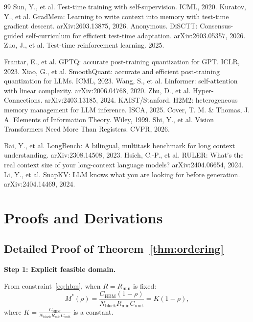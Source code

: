 \documentclass[11pt,a4paper]{article}
\theoremstyle{plain}
\theoremstyle{definition}
\begin{document}
\begin{thebibliography}{99}
 Sun, Y., et al. Test-time training with self-supervision. ICML, 2020.
 Kuratov, Y., et al. GradMem: Learning to write context into memory with test-time gradient descent. arXiv:2603.13875, 2026.
 Anonymous. DiSCTT: Consensus-guided self-curriculum for efficient test-time adaptation. arXiv:2603.05357, 2026.
 Zuo, J., et al. Test-time reinforcement learning. 2025.

 Frantar, E., et al. GPTQ: accurate post-training quantization for GPT. ICLR, 2023.
 Xiao, G., et al. SmoothQuant: accurate and efficient post-training quantization for LLMs. ICML, 2023.
 Wang, S., et al. Linformer: self-attention with linear complexity. arXiv:2006.04768, 2020.
 Zhu, D., et al. Hyper-Connections. arXiv:2403.13185, 2024.
 KAIST/Stanford. H2M2: heterogeneous memory management for LLM inference. ISCA, 2025.
 Cover, T. M. \& Thomas, J. A. Elements of Information Theory. Wiley, 1999.
 Shi, Y., et al. Vision Transformers Need More Than Registers. CVPR, 2026.

 Bai, Y., et al. LongBench: A bilingual, multitask benchmark for long context understanding. arXiv:2308.14508, 2023.
 Hsieh, C.-P., et al. RULER: What's the real context size of your long-context language models? arXiv:2404.06654, 2024.
 Li, Y., et al. SnapKV: LLM knows what you are looking for before generation. arXiv:2404.14469, 2024.

\end{thebibliography}

\appendix
\section{Proofs and Derivations}
\label{app:proofs}

\subsection{Detailed Proof of Theorem~\ref{thm:ordering}}
\label{app:proof_order}

\textbf{Step 1: Explicit feasible domain.}

From constraint~\eqref{eq:hbm}, when $R = R_{\min}$ is fixed:
\[
M^*(\rho) = \frac{C_{\text{HBM}}(1-\rho)}{N_{\text{block}} R_{\min} C_{\text{unit}}} = K(1-\rho),
\]
where $K = \frac{C_{\text{HBM}}}{N_{\text{block}} R_{\min} C_{\text{unit}}}$ is a constant.
\end{document}
